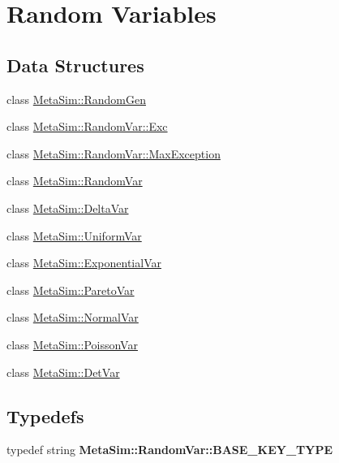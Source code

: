 \hypertarget{group__metasim__random}{}\section{Random Variables}
\label{group__metasim__random}
\subsection*{Data Structures}
\begin{DoxyCompactItemize}
\item 
class \hyperlink{classMetaSim_1_1RandomGen}{Meta\+Sim\+::\+Random\+Gen}
\item 
class \hyperlink{classMetaSim_1_1RandomVar_1_1Exc}{Meta\+Sim\+::\+Random\+Var\+::\+Exc}
\item 
class \hyperlink{classMetaSim_1_1RandomVar_1_1MaxException}{Meta\+Sim\+::\+Random\+Var\+::\+Max\+Exception}
\item 
class \hyperlink{classMetaSim_1_1RandomVar}{Meta\+Sim\+::\+Random\+Var}
\item 
class \hyperlink{classMetaSim_1_1DeltaVar}{Meta\+Sim\+::\+Delta\+Var}
\item 
class \hyperlink{classMetaSim_1_1UniformVar}{Meta\+Sim\+::\+Uniform\+Var}
\item 
class \hyperlink{classMetaSim_1_1ExponentialVar}{Meta\+Sim\+::\+Exponential\+Var}
\item 
class \hyperlink{classMetaSim_1_1ParetoVar}{Meta\+Sim\+::\+Pareto\+Var}
\item 
class \hyperlink{classMetaSim_1_1NormalVar}{Meta\+Sim\+::\+Normal\+Var}
\item 
class \hyperlink{classMetaSim_1_1PoissonVar}{Meta\+Sim\+::\+Poisson\+Var}
\item 
class \hyperlink{classMetaSim_1_1DetVar}{Meta\+Sim\+::\+Det\+Var}
\end{DoxyCompactItemize}
\subsection*{Typedefs}
\begin{DoxyCompactItemize}
\item 
typedef string {\bfseries Meta\+Sim\+::\+Random\+Var\+::\+B\+A\+S\+E\+\_\+\+K\+E\+Y\+\_\+\+T\+Y\+PE}\hypertarget{group__metasim__random_ga52651dcdbc504543dced63c7b576cac8}{}\label{group__metasim__random_ga52651dcdbc504543dced63c7b576cac8}

\end{DoxyCompactItemize}
